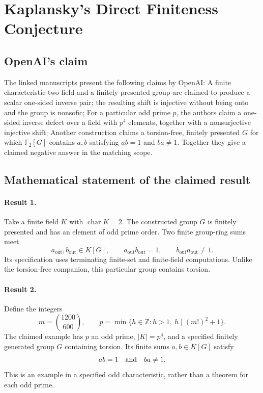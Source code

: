 \documentclass[11pt]{article}
\begin{document}
\section*{Kaplansky's Direct Finiteness Conjecture}

\subsection{OpenAI's claim}
The linked manuscripts present the following claims by OpenAI: A finite characteristic-two field and a finitely presented group are claimed to produce a scalar one-sided inverse pair; the resulting shift is injective without being onto and the group is nonsofic; For a particular odd prime $p$, the authors claim a one-sided inverse defect over a field with $p^4$ elements, together with a nonsurjective injective shift; Another construction claims a torsion-free, finitely presented $G$ for which $\mathbb F_2[G]$ contains $a,b$ satisfying $ab=1$ and $ba\ne1$. Together they give a claimed negative answer in the matching scope.

\subsection{Mathematical statement of the claimed result}
\paragraph{Result 1.} Take a finite field \(K\) with \(\operatorname{char}K=2\). The constructed group \(G\) is finitely presented and has an element of odd prime order. Two finite group-ring sums meet
\[
 a_{\mathrm{out}},b_{\mathrm{out}}\in K[G],\qquad
 a_{\mathrm{out}}b_{\mathrm{out}}=1,\qquad
 b_{\mathrm{out}}a_{\mathrm{out}}\ne1.
\]
Its specification uses terminating finite-set and finite-field computations. Unlike the torsion-free companion, this particular group contains torsion.

\paragraph{Result 2.} Define the integers
\[
 m=\binom{1200}{600},\qquad
 p=\min\{h\in\mathbb Z:h>1,\ h\mid(m!)^2+1\}.
\]
The claimed example has \(p\) an odd prime, \(|K|=p^4\), and a specified finitely generated group \(G\) containing torsion. Its finite sums \(a,b\in K[G]\) satisfy
\[
 ab=1\quad\hbox{and}\quad ba\ne1.
\]
This is an example in a specified odd characteristic, rather than a theorem for each odd prime.
\end{document}
